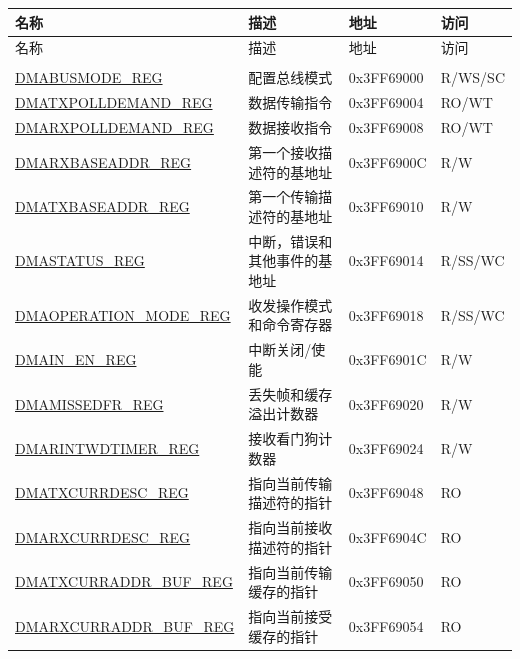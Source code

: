 

\begin{longtable}{ |m{5cm} |m{6.3cm} | m{2cm} | m{2.2cm} | }
\hline\rowcolor{lightgray}
名称 & 描述 &  地址 & 访问 \\ \hline
\endfirsthead
\hline
\rowcolor{lightgray}
名称 & 描述 &  地址 & 访问\\ \hline
\endhead
\hline
\endfoot
\hline
\endlastfoot

\multicolumn{4}{|l|}{\textbf{DMA 配置和控制寄存器}} \\ \hline
\hyperref[regdesc:DMABUSMODEREG]{DMABUSMODE\_REG} & 配置总线模式 & 0x3FF69000 & R/WS/SC \\ \hline
\hyperref[regdesc:DMATXPOLLDEMANDREG]{DMATXPOLLDEMAND\_REG} &  数据传输指令& 0x3FF69004 & RO/WT \\ \hline
\hyperref[regdesc:DMARXPOLLDEMANDREG]{DMARXPOLLDEMAND\_REG} & 数据接收指令& 0x3FF69008 & RO/WT \\ \hline
\hyperref[regdesc:DMARXBASEADDRREG]{DMARXBASEADDR\_REG} &  第一个接收描述符的基地址 & 0x3FF6900C & R/W \\ \hline
\hyperref[regdesc:DMATXBASEADDRREG]{DMATXBASEADDR\_REG} &  第一个传输描述符的基地址& 0x3FF69010 & R/W \\ \hline
\hyperref[regdesc:DMASTATUSREG]{DMASTATUS\_REG} & 中断，错误和其他事件的基地址 & 0x3FF69014 & R/SS/WC \\ \hline
\hyperref[regdesc:DMAOPERATION_MODEREG]{DMAOPERATION\_MODE\_REG} & 收发操作模式和命令寄存器 & 0x3FF69018 & R/SS/WC \\ \hline
\hyperref[regdesc:DMAINENREG]{DMAIN\_EN\_REG} & 中断关闭/使能 & 0x3FF6901C & R/W \\ \hline
\hyperref[regdesc:DMAMISSEDFRREG]{DMAMISSEDFR\_REG} & 丢失帧和缓存溢出计数器
& 0x3FF69020 & R/W \\ \hline
\hyperref[regdesc:DMARINTWDTIMERREG]{DMARINTWDTIMER\_REG} &  接收看门狗计数器 & 0x3FF69024 & R/W \\ \hline
\hyperref[regdesc:DMATXCURRDESCREG]{DMATXCURRDESC\_REG} &  指向当前传输描述符的指针 & 0x3FF69048 & RO \\ \hline
\hyperref[regdesc:DMARXCURRDESCREG]{DMARXCURRDESC\_REG} & 指向当前接收描述符的指针& 0x3FF6904C & RO \\ \hline
\hyperref[regdesc:DMATXCURRADDRBUFREG]{DMATXCURRADDR\_BUF\_REG} & 指向当前传输缓存的指针& 0x3FF69050 & RO \\ \hline
\hyperref[regdesc:DMARXCURRADDRBUFREG]{DMARXCURRADDR\_BUF\_REG} & 指向当前接受缓存的指针& 0x3FF69054 & RO \\ \hline

\end{longtable}

